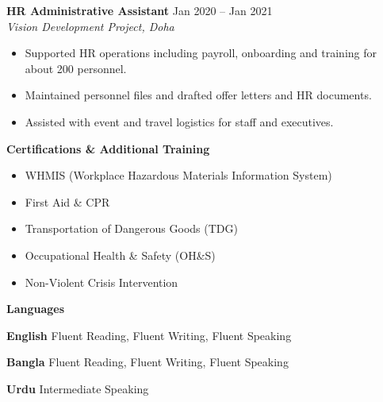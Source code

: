 \documentclass[11pt]{article} %
\newcommand{\cvsection}[1] {
  \begin{center}
    \large\textbf{#1}
  \end{center}
}
\begin{document}
\textbf{HR Administrative Assistant} \hfill Jan 2020 -- Jan 2021 \\
\emph{Vision Development Project, Doha}
\begin{itemize}
  \setlength\itemsep{-1mm}
\item Supported HR operations including payroll, onboarding and training for about 200 personnel.
\item Maintained personnel files and drafted offer letters and HR documents.
\item Assisted with event and travel logistics for staff and executives.
\end{itemize}

\cvsection{Certifications \& Additional Training}
\begin{itemize}
  \setlength\itemsep{-1mm}
\item WHMIS (Workplace Hazardous Materials Information System)
\item First Aid \& CPR
\item Transportation of Dangerous Goods (TDG)
\item Occupational Health \& Safety (OH\&S)
\item Non-Violent Crisis Intervention
\end{itemize}

\cvsection{Languages}
\textbf{English} Fluent Reading, Fluent Writing, Fluent Speaking

\textbf{Bangla} Fluent Reading, Fluent Writing, Fluent Speaking

\textbf{Urdu} Intermediate Speaking
\end{document}
